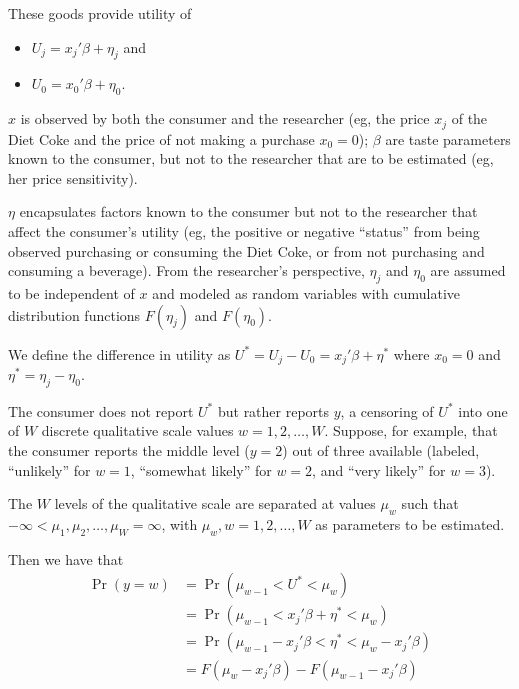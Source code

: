 \documentclass[
]{article}
\providecommand{\tightlist}{%
  \setlength{\itemsep}{0pt}\setlength{\parskip}{0pt}}\usepackage{longtable,booktabs,array}
\begin{document}
These goods provide utility of

\begin{itemize}
\tightlist
\item
  \(U_j = x_j'\beta + \eta_j\) and
\item
  \(U_0 = x_0'\beta + \eta_0\).
\end{itemize}

\(x\) is observed by both the consumer and the researcher (eg, the price
\(x_j\) of the Diet Coke and the price of not making a purchase
\(x_0=0\)); \(\beta\) are taste parameters known to the consumer, but
not to the researcher that are to be estimated (eg, her price
sensitivity).

\(\eta\) encapsulates factors known to the consumer but not to the
researcher that affect the consumer's utility (eg, the positive or
negative ``status'' from being observed purchasing or consuming the Diet
Coke, or from not purchasing and consuming a beverage). From the
researcher's perspective, \(\eta_j\) and \(\eta_0\) are assumed to be
independent of \(x\) and modeled as random variables with cumulative
distribution functions \(F(\eta_j)\) and \(F(\eta_0)\).

We define the difference in utility as
\(U^* = U_j - U_0 = x_j'\beta + \eta^*\) where \(x_0 = 0\) and
\(\eta^* = \eta_j - \eta_0\).

The consumer does not report \(U^*\) but rather reports \(y\), a
censoring of \(U^*\) into one of \(W\) discrete qualitative scale values
\(w=1,2,\ldots,W\). Suppose, for example, that the consumer reports the
middle level (\(y=2\)) out of three available (labeled, ``unlikely'' for
\(w=1\), ``somewhat likely'' for \(w=2\), and ``very likely'' for
\(w=3\)).

The \(W\) levels of the qualitative scale are separated at values
\(\mu_w\) such that \(-\infty < \mu_1, \mu_2, \ldots, \mu_W = \infty\),
with \(\mu_w, w=1,2,\ldots,W\) as parameters to be estimated.

Then we have that \[
\begin{aligned}
    \Pr \left( y=w \right) 
    &= \Pr \left(\mu_{w-1} < U^* < \mu_w \right) \\
    &= \Pr \left(\mu_{w-1} < x_j'\beta + \eta^* < \mu_w \right) \\
    &= \Pr \left(\mu_{w-1} - x_j'\beta < \eta^* < \mu_w - x_j'\beta \right) \\
    &= F(\mu_w - x_j'\beta) - F(\mu_{w-1} - x_j'\beta)
\end{aligned}
\]
\end{document}
